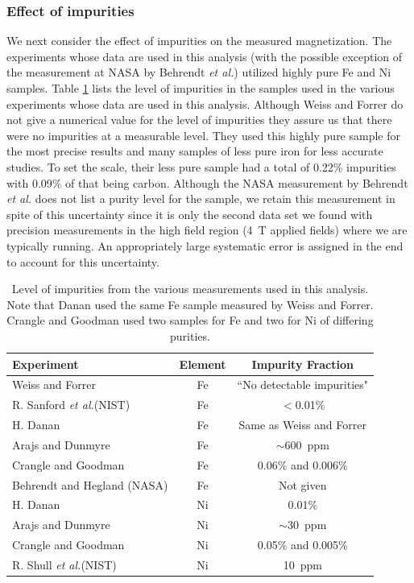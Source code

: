 \documentclass[preprint,12pt]{elsarticle}
\begin{document}
\subsubsection{Effect of impurities}
We next consider the effect of impurities on the measured magnetization. The experiments whose data are used in this analysis (with the possible exception of the measurement at NASA by Behrendt {\it et al.}) utilized highly pure Fe and Ni samples. Table \ref{tab:impurities} lists the level of impurities in the samples used in the various experiments whose data are used in this analysis. Although Weiss and Forrer \cite{Weiss1929} do not give a numerical value for the level of impurities they assure us that there were no impurities at a measurable level. They used this highly pure sample for the most precise results and many samples of less pure iron for less accurate studies. To set the scale, their less pure sample had a total of 0.22\% impurities with 0.09\% of that being carbon. Although the NASA measurement by Behrendt {\it et al.} does not list a purity level for the sample, we retain this measurement in spite of this uncertainty since it is only the second data set we found with precision measurements in the high field region (4~T applied fields) where we are typically running. An appropriately large systematic error is assigned in the end to account for this uncertainty.
\begin{table}[]
\caption{Level of impurities from the various measurements used in this analysis. Note that Danan used the same Fe sample measured by Weiss and Forrer. Crangle and Goodman used two samples for Fe and two for Ni of differing purities.}
\begin{center}
\begin{tabular}{|l|c|c|}\hline
Experiment&Element&Impurity Fraction\\\hline
Weiss and Forrer \cite{Weiss1929} & Fe&``No detectable impurities"\\
R. Sanford {\it et al.}(NIST)\cite{Sanford1941} & Fe&$<$0.01\%\\
H. Danan \cite{Danan1959, Danan1968}& Fe&Same as Weiss and Forrer\\
Arajs and Dunmyre \cite{Arajs1964}\cite{Arajs1967}&Fe& $\sim$600~ppm\\
Crangle and Goodman \cite{Crangle1971} & Fe & 0.06\% and 0.006\%\\
Behrendt and Hegland (NASA)\cite{Behrendt1972} & Fe & Not given\\\hline
H. Danan \cite{Danan1959, Danan1968} & Ni&0.01\% \\
Arajs and Dunmyre \cite{Arajs1963, Arajs1965, Arajs1967}&Ni& $\sim$30~ppm\\
Crangle and Goodman \cite{Crangle1971} & Ni & 0.05\% and 0.005\%\\
R. Shull {\it et al.}(NIST) & Ni & 10~ppm\\\hline
\end{tabular}
\end{center}
\label{tab:impurities}
\end{table}%
\end{document}
